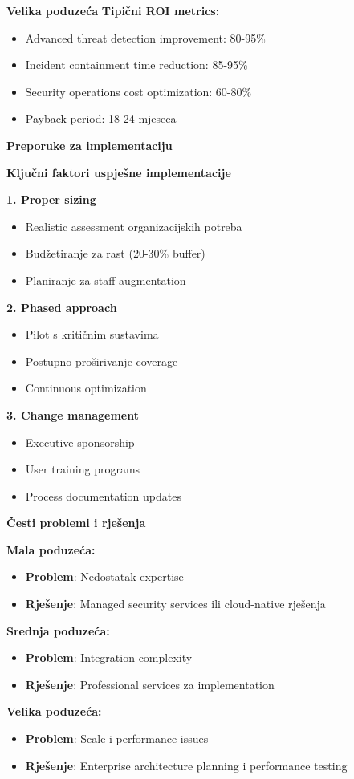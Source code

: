 \textbf{Velika poduzeća}
\textbf{Tipični ROI metrics:}
\begin{itemize}
\item Advanced threat detection improvement: 80-95\%
\item Incident containment time reduction: 85-95\%
\item Security operations cost optimization: 60-80\%
\item Payback period: 18-24 mjeseca
\end{itemize}

\textbf{Preporuke za implementaciju}

\textbf{Ključni faktori uspješne implementacije}

\textbf{1. Proper sizing}
\begin{itemize}
\item Realistic assessment organizacijskih potreba
\item Budžetiranje za rast (20-30\% buffer)
\item Planiranje za staff augmentation
\end{itemize}

\textbf{2. Phased approach}
\begin{itemize}
\item Pilot s kritičnim sustavima
\item Postupno proširivanje coverage
\item Continuous optimization
\end{itemize}

\textbf{3. Change management}
\begin{itemize}
\item Executive sponsorship
\item User training programs
\item Process documentation updates
\end{itemize}

\textbf{Česti problemi i rješenja}

\textbf{Mala poduzeća:}
\begin{itemize}
\item \textbf{Problem}: Nedostatak expertise
\item \textbf{Rješenje}: Managed security services ili cloud-native rješenja
\end{itemize}

\textbf{Srednja poduzeća:}
\begin{itemize}
\item \textbf{Problem}: Integration complexity
\item \textbf{Rješenje}: Professional services za implementation
\end{itemize}

\textbf{Velika poduzeća:}
\begin{itemize}
\item \textbf{Problem}: Scale i performance issues
\item \textbf{Rješenje}: Enterprise architecture planning i performance testing
\end{itemize}